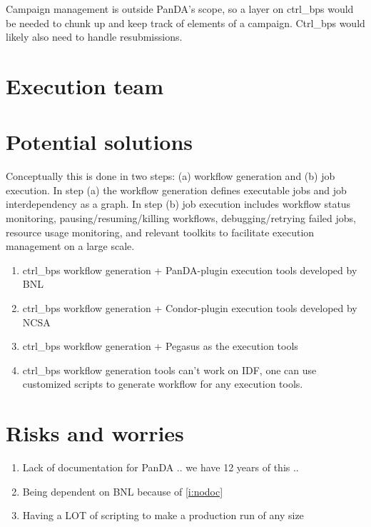 Campaign management is outside PanDA’s scope, so a layer on ctrl\_bps would be needed to chunk up and keep track of elements of a campaign. Ctrl\_bps would likely also need to handle resubmissions.


\section {Execution team }


\section {Potential solutions} \label{sec:potential}

Conceptually this is done in two steps: (a) workflow generation and (b) job execution.
In step (a) the workflow generation defines executable jobs and job interdependency as a graph.
In step (b) job execution includes workflow status monitoring, pausing/resuming/killing workflows, debugging/retrying failed jobs, resource usage monitoring, and relevant toolkits to facilitate execution management on a large scale.
\begin{enumerate}
\item  ctrl\_bps workflow generation + PanDA-plugin execution tools developed by BNL
\item ctrl\_bps workflow generation + Condor-plugin execution tools developed by NCSA
\item ctrl\_bps workflow generation + Pegasus as the execution tools
\item ctrl\_bps workflow generation tools can't work on IDF, one can use customized scripts to generate workflow for any execution tools.
\end{enumerate}



\section {Risks and worries}

\begin{enumerate}
\item Lack of documentation for PanDA .. we have 12 years of this ..\label{i:nodoc}
\item Being dependent on BNL because of \ref{i:nodoc}
\item Having a LOT of scripting to make a production run of any size
\end{enumerate}
